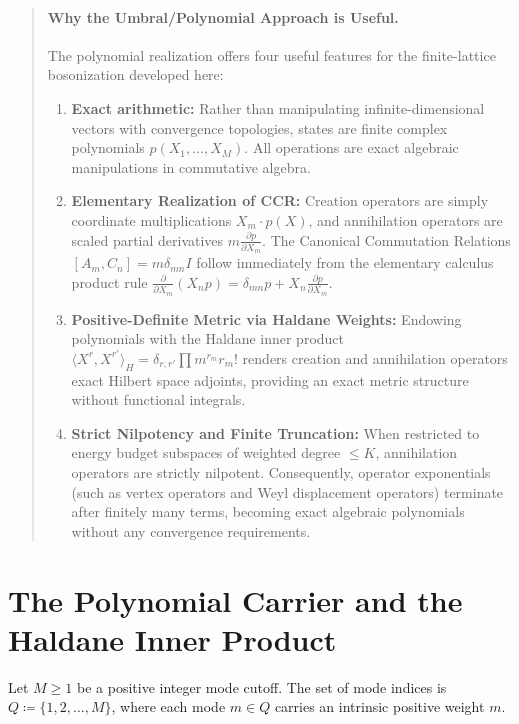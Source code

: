 \begin{quote}
\item[]\paragraph{Why the Umbral/Polynomial Approach is Useful.}
The polynomial realization offers four useful features for the finite-lattice bosonization developed here:
\begin{enumerate}
    \item \textbf{Exact arithmetic:} Rather than manipulating infinite-dimensional vectors with convergence topologies, states are finite complex polynomials $p(X_1, \dots, X_M)$. All operations are exact algebraic manipulations in commutative algebra.
    \item \textbf{Elementary Realization of CCR:} Creation operators are simply coordinate multiplications $X_m \cdot p(X)$, and annihilation operators are scaled partial derivatives $m \frac{\partial p}{\partial X_m}$. The Canonical Commutation Relations $[A_m, C_n] = m \delta_{mn} I$ follow immediately from the elementary calculus product rule $\frac{\partial}{\partial X_m}(X_n p) = \delta_{mn} p + X_n \frac{\partial p}{\partial X_m}$.
    \item \textbf{Positive-Definite Metric via Haldane Weights:} Endowing polynomials with the Haldane inner product $\langle X^r, X^{r'} \rangle_H = \delta_{r, r'} \prod m^{r_m} r_m!$ renders creation and annihilation operators exact Hilbert space adjoints, providing an exact metric structure without functional integrals.
    \item \textbf{Strict Nilpotency and Finite Truncation:} When restricted to energy budget subspaces of weighted degree $\le K$, annihilation operators are strictly nilpotent. Consequently, operator exponentials (such as vertex operators and Weyl displacement operators) terminate after finitely many terms, becoming exact algebraic polynomials without any convergence requirements.
\end{enumerate}

\end{quote}

\section{The Polynomial Carrier and the Haldane Inner Product}

Let $M \ge 1$ be a positive integer mode cutoff. The set of mode indices is $Q \coloneqq \{1, 2, \dots, M\}$, where each mode $m \in Q$ carries an intrinsic positive weight $m$.

